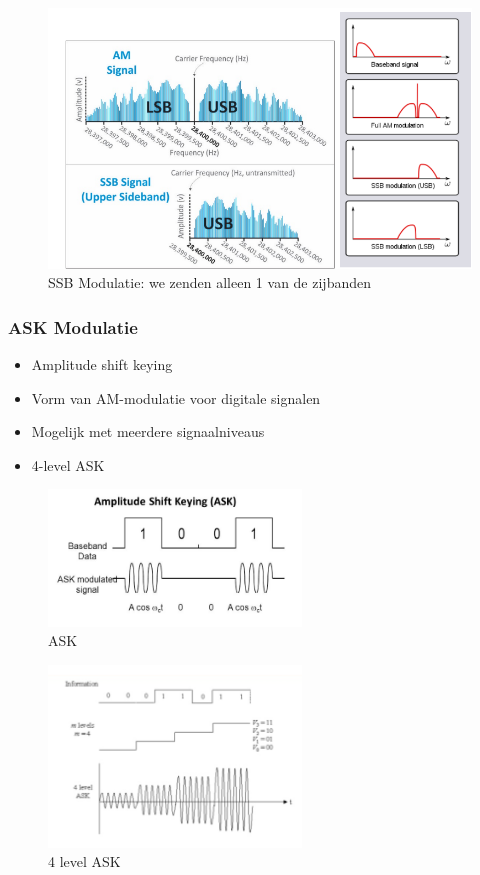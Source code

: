 \documentclass{article}
\begin{document}
\begin{figure}[H]
    \centering
    \includegraphics[width=\textwidth]{Screenshot_20200302_120812.png}    
    \caption{SSB Modulatie: we zenden alleen 1 van de zijbanden}
\end{figure}

\subsubsection{ASK Modulatie}
\begin{itemize}
    \item Amplitude shift keying
    \item Vorm van AM-modulatie voor digitale signalen
    \item Mogelijk met meerdere signaalniveaus
    \item 4-level ASK
\end{itemize}

\begin{figure}[H]
    \centering
    \includegraphics[width=0.6\textwidth]{Screenshot_20200302_121007.png}
    \caption{ASK}
\end{figure}

\begin{figure}[H]
    \centering
    \includegraphics[width=0.6\textwidth]{Screenshot_20200302_121031.png}
    \caption{4 level ASK}
\end{figure}
\end{document}
